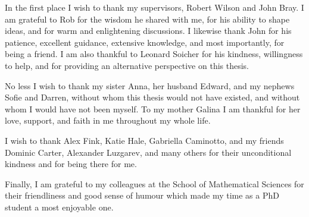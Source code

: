

\begin{acknowledgements}      %


In the first place I wish to thank my supervisors,
Robert Wilson and John Bray. I am grateful to Rob for the 
wisdom he shared with me, for his ability to shape ideas,
and for warm and enlightening discussions. I likewise thank
John for his patience, excellent guidance, extensive
knowledge, and most importantly, for being a friend. I am also thankful to Leonard Soicher
for his kindness, willingness to help, 
and for providing an alternative perspective
on this thesis.

No less I wish to thank my sister Anna, her husband Edward, and my nephews Sofie and Darren, without whom 
this thesis would not have existed, and without whom I would
have not been myself. To my mother Galina I am thankful for her love,
support, and faith in me throughout my whole life. 

I wish to thank Alex Fink, Katie Hale, Gabriella Caminotto, and my friends 
Dominic Carter, Alexander Luzgarev, and many others for their unconditional kindness 
and for being there for me. 

Finally, I am grateful to my colleagues
at the School of Mathematical Sciences for their friendliness
and good sense of humour which made my time as a PhD student
a most enjoyable one. 


\end{acknowledgements}


